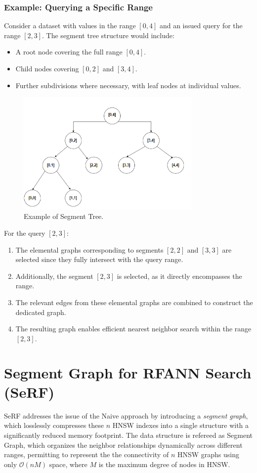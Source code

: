 \subsubsection{Example: Querying a Specific Range}
Consider a dataset with values in the range $[0,4]$ and an issued query for the range $[2,3]$. The segment tree structure would include:
\begin{itemize}
    \item A root node covering the full range $[0,4]$.
    \item Child nodes covering $[0,2]$ and $[3,4]$.
    \item Further subdivisions where necessary, with leaf nodes at individual values.
\end{itemize}

\begin{figure}[h]
    \centering
\includegraphics[width=0.8\textwidth]{IMAGES/immagine_2025-02-28_120223507.png}
    \caption{Example of Segment Tree.}
    \label{fig:Segment Tree}
\end{figure}

For the query $[2,3]$:
\begin{enumerate}
    \item The elemental graphs corresponding to segments $[2,2]$ and $[3,3]$ are selected since they fully intersect with the query range.
    \item Additionally, the segment $[2,3]$ is selected, as it directly encompasses the range.
    \item The relevant edges from these elemental graphs are combined to construct the dedicated graph.
    \item The resulting graph enables efficient nearest neighbor search within the range $[2,3]$.
\end{enumerate}

\section{Segment Graph for RFANN Search (SeRF)}
SeRF addresses the issue of the Naive approach by introducing a \textit{segment graph}, which losslessly compresses these $n$ HNSW indexes into a single structure with a significantly reduced memory footprint. The data structure is refereed as Segment Graph, which organizes the neighbor relationships dynamically across different ranges, permitting to represent the the connectivity of $n$ HNSW graphs using only $\mathcal{O}(nM)$ space, where $M$ is the maximum degree of nodes in HNSW.

